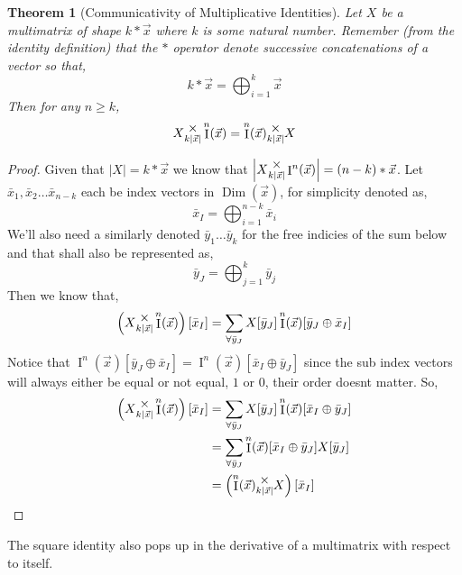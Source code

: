 \documentclass[12pt]{book}
\theoremstyle{plain}
\newtheorem{theorem}{Theorem}[chapter]
\theoremstyle{definition}
\theoremstyle{ppart}
\theoremstyle{case}
\theoremstyle{solution}
\DeclareMathOperator{\Dim}{Dim}
\DeclareMathOperator{\Ident}{I}
\newcommand{\mmult}[1]{\text{\raisebox{1ex}{$\underset{#1}{\times}$}}}
\newcommand{\shape}[1]{\left|#1\right|}
\begin{document}
\begin{theorem}[Communicativity of Multiplicative Identities]
Let $X$ be a multimatrix of shape $k * \vec{x}$ where $k$ is some natural number.
Remember (from the identity definition) that the $*$ operator denote successive concatenations of a vector so that,
\[ k * \vec{x} = \bigoplus_{i=1}^k \vec{x} \]
Then for any $n \ge k$,
\[ X \mmult{k \shape{\vec{x}}} \Ident^n(\vec{x}) = \Ident^n(\vec{x}) \mmult{k \shape{\vec{x}}} X \]
\end{theorem}
\begin{proof}
Given that $\shape{X} = k * \vec{x}$ we know that
$\shape{X \mmult{k \shape{\vec{x}}} \Ident^n(\vec{x})} = (n-k) * \vec{x}$.
Let $\bar{x}_1, \bar{x}_2 \ldots \bar{x}_{n-k}$ each be index vectors in $\Dim(\vec{x})$,
for simplicity denoted as,
\[ \bar{x}_I = \bigoplus_{i=1}^{n-k} \bar{x}_i \]
We'll also need a similarly denoted $\bar{y}_1 \ldots \bar{y}_k$ for the free indicies of
the sum below and that shall also be represented as,
\[ \bar{y}_J = \bigoplus_{j=1}^{k} \bar{y}_j \]
Then we know that,
\[
  \left(X \mmult{k \shape{\vec{x}}} \Ident^n(\vec{x}) \right)[\bar{x}_I]
  = \sum_{\forall \bar{y}_J} X[\bar{y}_J] \Ident^n(\vec{x})[\bar{y}_J \oplus \bar{x}_I]
\]
Notice that $\Ident^n(\vec{x})[\bar{y}_J \oplus \bar{x}_I] = \Ident^n(\vec{x})[\bar{x}_I \oplus \bar{y}_J]$
since the sub index vectors will always either be equal or not equal, $1$ or $0$, their order doesnt matter.
So,
\begin{align*}
  \left(X \mmult{k \shape{\vec{x}}} \Ident^n(\vec{x}) \right)[\bar{x}_I]
  &= \sum_{\forall \bar{y}_J} X[\bar{y}_J] \Ident^n(\vec{x})[\bar{x}_I \oplus \bar{y}_J] \\
  &= \sum_{\forall \bar{y}_J} \Ident^n(\vec{x})[\bar{x}_I \oplus \bar{y}_J] X[\bar{y}_J] \\
  &= \left(\Ident^n(\vec{x}) \mmult{k \shape{\vec{x}}} X \right)[\bar{x}_I]
\end{align*}
\end{proof}

The square identity also pops up in the derivative of a multimatrix
with respect to itself.
\end{document}
